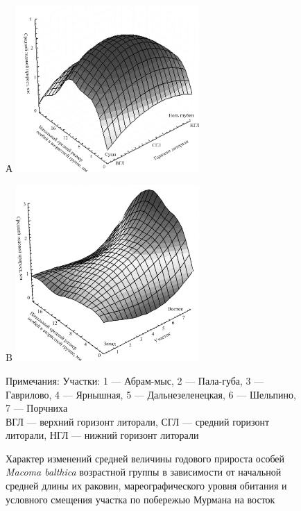 	\begin{figure}[h]
		\begin{minipage}[b]{.5\linewidth}
			\begin{center}
				{\small А}
				\includegraphics[width=70mm]{../Barenc_Sea/growth_from_MSc/prirost_otklik_mareography.jpg}
			\end{center}
		\end{minipage}
	\hfil %
		\begin{minipage}[b]{.5\linewidth}
			\begin{center}
				{\small B}
				\includegraphics[width=70mm]{../Barenc_Sea/growth_from_MSc/prirost_otklik_geography.jpg}
			\end{center}
		\end{minipage}
	\caption{Характер изменений средней величины годового прироста особей {\it Macoma balthica} возрастной группы в зависимости от начальной средней длины их раковин, мареографического уровня обитания и условного смещения участка по побережью Мурмана на восток}
\footnotesize{Примечания: Участки: 1 --- Абрам-мыс, 2 --- Пала-губа, 3 --- Гаврилово, 4 --- Ярнышная, 5 --- Дальнезеленецкая, 6 --- Шельпино, 7 --- Порчниха\\
ВГЛ --- верхний горизонт литорали, СГЛ --- средний горизонт литорали, НГЛ --- нижний горизонт литорали}
	\label{ris:prirost:otklik}
	\end{figure}
